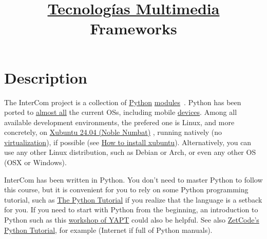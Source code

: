 
\title{\href{https://tecnologias-multimedia.github.io/}{Tecnologías Multimedia} \newline Frameworks}

\maketitle
\tableofcontents

\section{Description}

The InterCom project \cite{intercom} is a collection of
\href{https://www.python.org/}{Python}
\href{https://docs.python.org/3/tutorial/modules.html#modules}{modules}~\cite{python}.
Python has been ported to
\href{https://www.python.org/download/other/}{almost all} the current
OSs, including mobile \href{https://kivy.org/#home}{devices}. Among
all available development environments, the prefered one is Linux, and
more concretely, on \href{https://xubuntu.org/download/}{Xubuntu 24.04
  (Noble Numbat)} \cite{xubuntu}, running natively (no
\href{https://en.wikipedia.org/wiki/Virtualization}{virtualization}),
if possible (see
\href{https://vicente-gonzalez-ruiz.github.io/Xubuntu_install/}{How to
  install xubuntu}). Alternatively, you can use any other Linux
distribution, such as Debian or Arch, or even any other OS (OSX or
Windows).

InterCom has been written in Python. You don't need to master Python
to follow this course, but it is convenient for you to rely on some
Python programming tutorial, such as
\href{https://docs.python.org/3/tutorial/}{The Python Tutorial}
\cite{python-tutorial} if you realize that the language is a setback
for you. If you need to start with Python from the beginning, an
introduction to Python such as this
\href{https://github.com/vicente-gonzalez-ruiz/YAPT/tree/master/workshops/programacion_python_ESO}{workshop
  of YAPT} \cite{YAPT} could also be helpful. See also
\href{http://zetcode.com/lang/python/}{ZetCode's Python Tutorial}, for
example (Internet if full of Python manuals).

